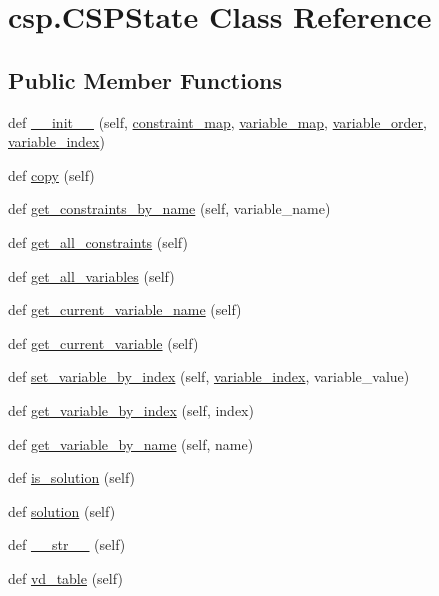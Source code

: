 \hypertarget{classcsp_1_1_c_s_p_state}{}\section{csp.\+C\+S\+P\+State Class Reference}
\label{classcsp_1_1_c_s_p_state}
\subsection*{Public Member Functions}
\begin{DoxyCompactItemize}
\item 
def \hyperlink{classcsp_1_1_c_s_p_state_af4c1179fcd168c100bcd59586ab4d303}{\+\_\+\+\_\+init\+\_\+\+\_\+} (self, \hyperlink{classcsp_1_1_c_s_p_state_a121e387a978bd94e973fd75e5a34d7aa}{constraint\+\_\+map}, \hyperlink{classcsp_1_1_c_s_p_state_a6aea06dad446dc6c3f0f801211511929}{variable\+\_\+map}, \hyperlink{classcsp_1_1_c_s_p_state_a43e4b250a7558b5f1429a25d15f4683f}{variable\+\_\+order}, \hyperlink{classcsp_1_1_c_s_p_state_a13ed1ff27ef3d9c6e13f124be61fed74}{variable\+\_\+index})
\item 
def \hyperlink{classcsp_1_1_c_s_p_state_a37eefac1cf30bbff64b8f216899d4e17}{copy} (self)
\item 
def \hyperlink{classcsp_1_1_c_s_p_state_a21ad4ae81d479bc9f9667dca72d598ed}{get\+\_\+constraints\+\_\+by\+\_\+name} (self, variable\+\_\+name)
\item 
def \hyperlink{classcsp_1_1_c_s_p_state_af20aebf66467e64e47ea46ddf5d0bc15}{get\+\_\+all\+\_\+constraints} (self)
\item 
def \hyperlink{classcsp_1_1_c_s_p_state_a2cc9093b1dfe47626c926b5e3c088822}{get\+\_\+all\+\_\+variables} (self)
\item 
def \hyperlink{classcsp_1_1_c_s_p_state_a7fdcc5e772d816835af290d65d7f139a}{get\+\_\+current\+\_\+variable\+\_\+name} (self)
\item 
def \hyperlink{classcsp_1_1_c_s_p_state_a7570a60bab86b1c20b0ad65544a2833d}{get\+\_\+current\+\_\+variable} (self)
\item 
def \hyperlink{classcsp_1_1_c_s_p_state_af21de7f4ee6ccec033123fa67e7787eb}{set\+\_\+variable\+\_\+by\+\_\+index} (self, \hyperlink{classcsp_1_1_c_s_p_state_a13ed1ff27ef3d9c6e13f124be61fed74}{variable\+\_\+index}, variable\+\_\+value)
\item 
def \hyperlink{classcsp_1_1_c_s_p_state_ad21332e62a47fe3ee947cbb27028ae03}{get\+\_\+variable\+\_\+by\+\_\+index} (self, index)
\item 
def \hyperlink{classcsp_1_1_c_s_p_state_a136ae090bcbc511ba7400d0764d4b370}{get\+\_\+variable\+\_\+by\+\_\+name} (self, name)
\item 
def \hyperlink{classcsp_1_1_c_s_p_state_a2dad0723eb508513e028c9cfc6907ae7}{is\+\_\+solution} (self)
\item 
def \hyperlink{classcsp_1_1_c_s_p_state_a93600486c87a23f34bd070352e52e8be}{solution} (self)
\item 
def \hyperlink{classcsp_1_1_c_s_p_state_a81baea18e6bd4a2e1bb5c62ad6753ba6}{\+\_\+\+\_\+str\+\_\+\+\_\+} (self)
\item 
def \hyperlink{classcsp_1_1_c_s_p_state_a88e923fb69359973abff84b535275aeb}{vd\+\_\+table} (self)
\end{DoxyCompactItemize}
